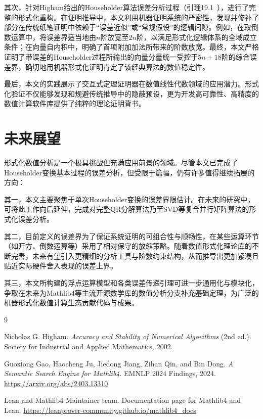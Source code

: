 ﻿\documentclass[UTF8,a4paper,openany]{ctexbook}
\theoremstyle{qrplain}
\begin{document}
其次，针对Higham给出的Householder算法误差分析过程（引理19.1~\cite{higham2002}），进行了完整的形式化重构。在证明推导中，本文利用机器证明系统的严密性，发现并修补了部分在传统纸笔证明中依赖于“误差近似”或“常规假设”的逻辑间隙。例如，在取倒数运算中，将误差界适当地由$n$阶放宽至$2n$阶，以满足形式化逻辑体系的全域成立条件；在向量自内积中，明确了首项附加加法所带来的阶数放宽。最终，本文严格证明了带误差的Householder过程所输出的向量分量统一受控于$5n+18$阶的综合误差界，确切地用机器形式化证明肯定了该经典算法的数值稳定性。

最后，本文的实践展示了交互式定理证明器在数值线性代数领域的应用潜力。形式化验证不仅能够发现和规避传统推导中的隐蔽预设，更为开发高可靠性、高精度的数值计算软件库提供了纯粹的理论证明背书。

\section{未来展望}

形式化数值分析是一个极具挑战但充满应用前景的领域。尽管本文已完成了Householder变换基本过程的误差分析，但受限于篇幅，仍有许多值得继续拓展的方向：

其一，本文主要聚焦于单次Householder变换的误差界限估计。在未来的研究中，可将此工作向后延伸，完成对完整QR分解算法乃至SVD等复合并行矩阵算法的形式化误差分析。

其二，目前定义的误差界为了保证系统证明的可组合性与顺畅性，在某些运算环节（如开方、倒数运算等）采用了相对保守的放缩策略。随着数值形式化理论库的不断完善，未来有望引入更精细的分析工具与阶数约束结构，从而推导出更加紧凑且贴近实际硬件舍入表现的误差上界。

其三，本文所构建的浮点运算模型和各类误差传递引理可进一步通用化与模块化，争取在未来为Mathlib4等主流开源数学库的数值分析分支补充基础定理，为广泛的机器形式化数值计算生态贡献代码与成果。



\begin{thebibliography}{9}

Nicholas G. Higham.
\textit{Accuracy and Stability of Numerical Algorithms} (2nd ed.).
Society for Industrial and Applied Mathematics, 2002.

Guoxiong Gao, Haocheng Ju, Jiedong Jiang, Zihan Qin, and Bin Dong.
\textit{A Semantic Search Engine for Mathlib4}.
EMNLP 2024 Findings, 2024.
\url{https://arxiv.org/abs/2403.13310}

Lean and Mathlib4 Maintainer team.
Documentation page for Mathlib4 and Lean.
\url{https://leanprover-community.github.io/mathlib4_docs}

\end{thebibliography}
\end{document}
